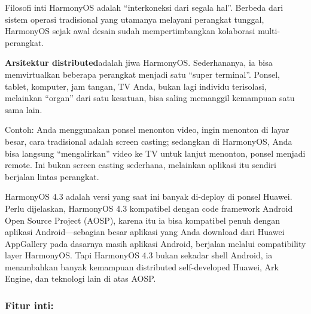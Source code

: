 


Filosofi inti HarmonyOS adalah “interkoneksi dari segala hal”. Berbeda dari sistem operasi tradisional yang utamanya melayani perangkat tunggal, HarmonyOS sejak awal desain sudah mempertimbangkan kolaborasi multi-perangkat.

\textbf{Arsitektur distributed}adalah jiwa HarmonyOS. Sederhananya, ia bisa memvirtualkan beberapa perangkat menjadi satu “super terminal”. Ponsel, tablet, komputer, jam tangan, TV Anda, bukan lagi individu terisolasi, melainkan “organ” dari satu kesatuan, bisa saling memanggil kemampuan satu sama lain.

Contoh: Anda menggunakan ponsel menonton video, ingin menonton di layar besar, cara tradisional adalah screen casting; sedangkan di HarmonyOS, Anda bisa langsung “mengalirkan” video ke TV untuk lanjut menonton, ponsel menjadi remote. Ini bukan screen casting sederhana, melainkan aplikasi itu sendiri berjalan lintas perangkat.


HarmonyOS 4.3 adalah versi yang saat ini banyak di-deploy di ponsel Huawei. Perlu dijelaskan, HarmonyOS 4.3 kompatibel dengan code framework Android Open Source Project (AOSP), karena itu ia bisa kompatibel penuh dengan aplikasi Android—sebagian besar aplikasi yang Anda download dari Huawei AppGallery pada dasarnya masih aplikasi Android, berjalan melalui compatibility layer HarmonyOS. Tapi HarmonyOS 4.3 bukan sekadar shell Android, ia menambahkan banyak kemampuan distributed self-developed Huawei, Ark Engine, dan teknologi lain di atas AOSP.

\subsubsection*{Fitur inti:}

